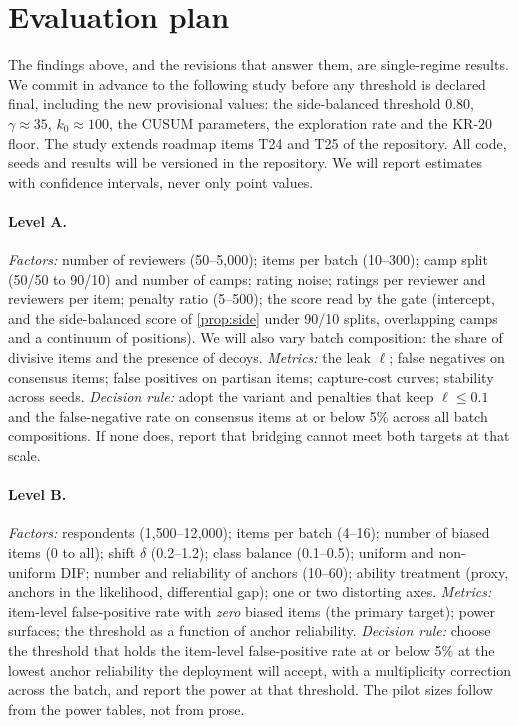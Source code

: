\section{Evaluation plan}\label{sec:plan}

The findings above, and the revisions that answer them, are single-regime results. We commit in
advance to the following study before any threshold is declared final, including the new
provisional values: the side-balanced threshold $0.80$, $\gamma\approx35$, $k_0\approx100$, the
CUSUM parameters, the exploration rate and the KR-20 floor. The study extends roadmap items T24
and T25 of the repository.
All code, seeds and results will be versioned in the repository. We will report estimates with
confidence intervals, never only point values.

\paragraph{Level A.}
\emph{Factors:} number of reviewers (50--5{,}000); items per batch (10--300); camp split
(50/50 to 90/10) and number of camps; rating noise; ratings per reviewer and reviewers per item;
penalty ratio (5--500); the score read by the gate (intercept, and the side-balanced score of
\cref{prop:side} under 90/10 splits, overlapping camps and a continuum of positions). We will also vary batch composition:
the share of divisive items and the presence of decoys.
\emph{Metrics:} the leak $\ell$; false negatives on consensus items; false positives on partisan
items; capture-cost curves; stability across seeds.
\emph{Decision rule:} adopt the variant and penalties that keep $\ell\le0.1$ and the
false-negative rate on consensus items at or below 5\% across all batch compositions. If none
does, report that bridging cannot meet both targets at that scale.

\paragraph{Level B.}
\emph{Factors:} respondents (1{,}500--12{,}000); items per batch (4--16); number of biased items
(0 to all); shift $\delta$ (0.2--1.2); class balance (0.1--0.5); uniform and non-uniform DIF;
number and reliability of anchors (10--60); ability treatment (proxy, anchors in the likelihood,
differential gap); one or two distorting axes.
\emph{Metrics:} item-level false-positive rate with \emph{zero} biased items (the primary
target); power surfaces; the threshold as a function of anchor reliability.
\emph{Decision rule:} choose the threshold that holds the item-level false-positive rate at or
below 5\% at the lowest anchor reliability the deployment will accept, with a multiplicity
correction across the batch, and report the power at that threshold. The pilot sizes follow from
the power tables, not from prose.

